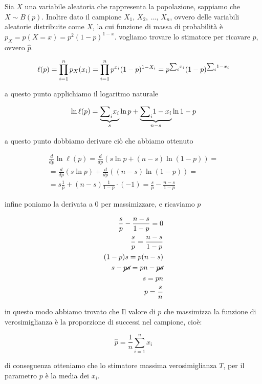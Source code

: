 \begin{esempio}
Sia $X$ una variabile aleatoria che rappresenta la popolazione, sappiamo che $X\sim B(p)$. Inoltre dato il campione $X_1,\, X_2,\, ...,\, X_n$, ovvero delle variabili aleatorie distribuite come $X$, la cui funzione di massa di probabilità è $p_X = p(X = x) = p^2(1-p)^{1-x}$.
vogliamo trovare lo stimatore per ricavare $p$, ovvero $\hat{p}$.

\begin{align*}
    \ell(p) = \prod_{i=1}^n p_X(x_i) = \prod_{i=1}^n p^{x_i}(1-p)^{1-X_i} = p^{{\sum}_i x_i}(1-p)^{{\sum}_i 1 - x_i} \\
\end{align*}

a questo punto applichiamo il logaritmo naturale

\begin{align*}
    \ln{\ell(p)} = \underbrace{{\sum}_i{x_i}}_{s} \ln{p} + \underbrace{{\sum}_i{1 - x_i}}_{n-s} \ln{1-p} 
\end{align*}

a questo punto dobbiamo derivare ciò che abbiamo ottenuto

\begin{align*}
    \frac{d}{dp} \ln{\ell(p)} = \frac{d}{dp} \left( s \ln{p} + (n - s) \ln{(1 - p)} \right) = \\ = \frac{d}{dp} \left( s \ln{p}\right) + \frac{d}{dp} \left((n - s) \ln{(1 - p)} \right) = \\
    = s \frac{1}{p} + (n - s) \frac{1}{1 - p} \cdot (-1) = \frac{s}{p} - \frac{n - s}{1 - p}
\end{align*}

infine poniamo la derivata a $0$ per massimizzare, e ricaviamo $p$

\begin{align*}
    \frac{s}{p} - \frac{n - s}{1 - p} = 0 \\
    \frac{s}{p} = \frac{n - s}{1 - p} \\
    (1-p)s = p(n - s) \\
    s - \cancel{ps} = pn - \cancel{ps} \\
    s = pn \\
    p = \frac{s}{n}
\end{align*}

\noindent in questo modo abbiamo trovato che Il valore di $p$ che massimizza la funzione di verosimiglianza è la proporzione di successi nel campione, cioè:

$$\hat{p} = \frac{1}{n}\sum_{i=1}^n x_i$$

\noindent di conseguenza otteniamo che lo stimatore massima verosimiglianza $T$, per il parametro $p$ è la media dei $x_i$.
\end{esempio}


